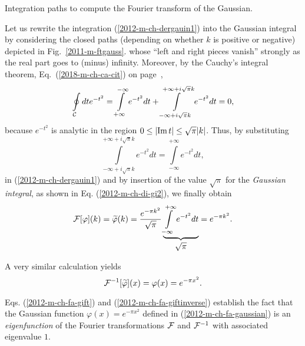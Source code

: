 {\begin{marginfigure}
\begin{center}
\begin{tikzpicture}  [scale=0.3]
\end{tikzpicture}
\end{center}
\caption{Integration paths to compute the  Fourier transform of the  Gaussian.}
\label{2011-m-ftgauss}
\end{marginfigure}
Let us rewrite the integration (\ref{2012-m-ch-dergauin1}) into the Gaussian integral by considering the closed paths
(depending on whether $k$ is positive or negative) depicted in Fig.~\ref{2011-m-ftgauss}.
whose ``left and right pieces vanish'' strongly as the real part goes to (minus) infinity.
Moreover,
by the Cauchy's integral theorem, Eq.~(\ref{2018-m-ch-ca-cit}) on page~\pageref{2018-m-ch-ca-cit},
\begin{equation}
   \oint\limits_{\cal C} dt e^{-t^2}=\int\limits_{+\infty}^{-\infty}
  e^{-t^2} dt +\int\limits_{-\infty+{i\sqrt{\pi} }k}^{+\infty+{i\sqrt{\pi} }k}
   e^{-t^2} dt =0,
\end{equation}
because $e^{-t^2}$ is analytic in the region $0\le \vert {\rm Im}\,t\vert \le \sqrt{\pi }\vert k \vert$.
Thus, by substituting
\begin{equation}
 \int\limits_{-\infty+{i}\sqrt{\pi} k}^{+\infty+{i}\sqrt{\pi} k}
   e^{-t^2} dt =\int\limits_{-\infty}^{+\infty}e^{-t^2}  dt   ,
\end{equation}
in (\ref{2012-m-ch-dergauin1})
and  by insertion of the value
$\sqrt\pi$ for the {\em Gaussian integral},
as shown in  Eq. (\ref{2012-m-ch-di-gi2}), we finally obtain
\begin{equation}
     {\cal F}[\varphi  ](k)=\widetilde{ \varphi} (k)=\frac{e^{-{\pi k^2 }}}{ \sqrt{\pi} }\underbrace{\int
   \limits_{-\infty}^{+\infty}e^{-t^2}dt}_{\mbox{$\sqrt\pi$}}=
   e^{-{\pi k^2}} .
\label{2012-m-ch-fa-gift}
\end{equation}

A very similar calculation yields
\begin{equation}
     {\cal F}^{-1}[\widetilde{\varphi}  ](x)= \varphi (x)= e^{-{\pi x^2}} .
\label{2012-m-ch-fa-giftinverse}
\end{equation}
\eexample
}

Eqs.
(\ref{2012-m-ch-fa-gift})
and
(\ref{2012-m-ch-fa-giftinverse})
establish the fact that
the Gaussian function
$\varphi (x) = e^{-{\pi x^2}}$ defined in
(\ref{2012-m-ch-fa-gaussian})
is an {\em eigenfunction}
of the Fourier transformations
${\cal F}$
and
${\cal F}^{-1}$ with associated eigenvalue $1$.


